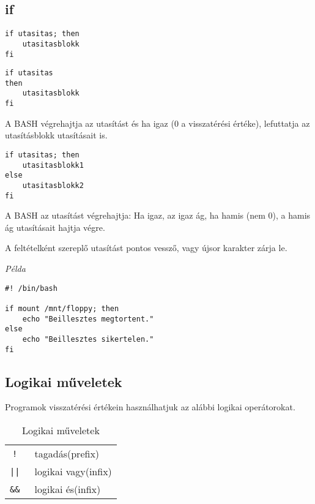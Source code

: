 \subsection{if}

\begin{minipage}{0.425\textwidth}
\lstset{linewidth=\textwidth}
\begin{lstlisting}
if utasitas; then
    utasitasblokk
fi
\end{lstlisting}
\end{minipage}
\hspace{1em}
\begin{minipage}{0.425\textwidth}
\lstset{linewidth=\textwidth}
\begin{lstlisting}
if utasitas
then
    utasitasblokk
fi
\end{lstlisting}
\end{minipage}


\noindent 
A BASH végrehajtja az utasítást és ha igaz (0 a visszatérési értéke), 
  lefuttatja az utasításblokk utasításait is.
\begin{lstlisting}
if utasitas; then
    utasitasblokk1
else
    utasitasblokk2
fi
\end{lstlisting}

\noindent
A BASH az utasítást végrehajtja: Ha igaz, az igaz ág, ha hamis (nem 0),
a hamis ág utasításait hajtja végre.\medskip

A feltételként szereplő utasítást pontos vessző, vagy újsor karakter zárja le.\bigskip

\emph{Példa}
\begin{lstlisting}
#! /bin/bash

if mount /mnt/floppy; then
    echo "Beillesztes megtortent."
else
    echo "Beillesztes sikertelen."
fi
\end{lstlisting}

\subsection{Logikai műveletek}
Programok visszatérési értékein használhatjuk az alábbi logikai operátorokat.

\begin{table}[!h]
\centering
\begin{tabular}{|cl|}
\hline
\tt!	& tagadás(prefix)\\
\tt|| 	& logikai vagy(infix)\\
\tt\&\&	& logikai és(infix)\\
\hline
\end{tabular}
\caption{Logikai műveletek}
\end{table}


